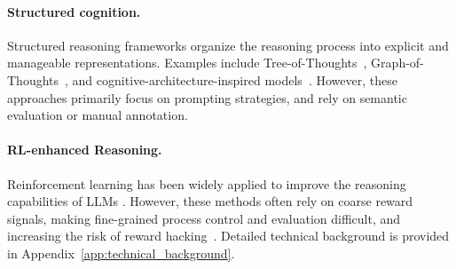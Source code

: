\paragraph{Structured cognition.} Structured reasoning frameworks organize the reasoning process into explicit and manageable representations. Examples include Tree-of-Thoughts~\citep{Yao2023TreeOT}, Graph-of-Thoughts~\citep{Besta2023GraphOT}, and cognitive-architecture-inspired models~\citep{Sumers2023CognitiveAF}. However, these approaches primarily focus on prompting strategies, and rely on semantic evaluation or manual annotation.

\paragraph{RL-enhanced Reasoning.} Reinforcement learning has been widely applied to improve the reasoning capabilities of LLMs \cite{Xu2025TowardsLR,Zhang2025ASO,Yuan2024FreePR}. However, these methods often rely on coarse reward signals, making fine-grained process control and evaluation difficult, and increasing the risk of reward hacking~\citep{Denison2024SycophancyTS}. Detailed technical background is provided in Appendix~\ref{app:technical_background}.